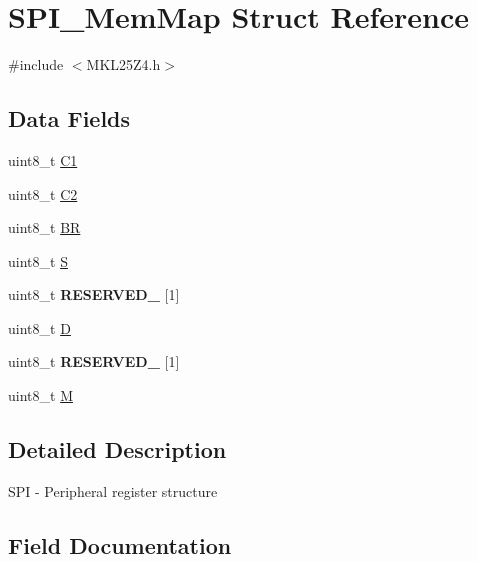 \hypertarget{struct_s_p_i___mem_map}{}\section{S\+P\+I\+\_\+\+Mem\+Map Struct Reference}
\label{struct_s_p_i___mem_map}


{\ttfamily \#include $<$M\+K\+L25\+Z4.\+h$>$}

\subsection*{Data Fields}
\begin{DoxyCompactItemize}
\item 
uint8\+\_\+t \hyperlink{struct_s_p_i___mem_map_a8286c9d870f31a089d95e6a2285fbe2f}{C1}
\item 
uint8\+\_\+t \hyperlink{struct_s_p_i___mem_map_acdf8ac8ab339152eaed13f4eca300aa5}{C2}
\item 
uint8\+\_\+t \hyperlink{struct_s_p_i___mem_map_a48949110e9f7763216965bf0eef8dec2}{B\+R}
\item 
uint8\+\_\+t \hyperlink{struct_s_p_i___mem_map_aef44b210af6af7cb40efdfd5469406c0}{S}
\item 
\hypertarget{struct_s_p_i___mem_map_a4be6979b69000068ac5203085d425825}{}uint8\+\_\+t {\bfseries R\+E\+S\+E\+R\+V\+E\+D\+\_} \mbox{[}1\mbox{]}\label{struct_s_p_i___mem_map_a4be6979b69000068ac5203085d425825}

\item 
uint8\+\_\+t \hyperlink{struct_s_p_i___mem_map_a42ede28e876dcdb2ce2ddd730de0401e}{D}
\item 
\hypertarget{struct_s_p_i___mem_map_a83b2d6f5756a9b0aa609216190380d5f}{}uint8\+\_\+t {\bfseries R\+E\+S\+E\+R\+V\+E\+D\+\_} \mbox{[}1\mbox{]}\label{struct_s_p_i___mem_map_a83b2d6f5756a9b0aa609216190380d5f}

\item 
uint8\+\_\+t \hyperlink{struct_s_p_i___mem_map_ae2c8107d00d3c9942e7a20fc598edecf}{M}
\end{DoxyCompactItemize}


\subsection{Detailed Description}
S\+P\+I -\/ Peripheral register structure 

\subsection{Field Documentation}
\hypertarget{struct_s_p_i___mem_map_a48949110e9f7763216965bf0eef8dec2}{}
